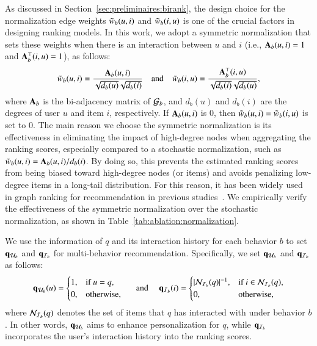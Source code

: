 As discussed in Section~\ref{sec:preliminaires:birank}, the design choice for the normalization edge weights $\tilde{w}_{b}(u, i)$ and $\tilde{w}_{b}(i, u)$ is one of the crucial factors in designing ranking models.
In this work, we adopt a symmetric normalization that sets these weights when there is an interaction between $u$ and $i$ (i.e., $\mathbf{A}_{b}(u,i)=1$ and $\mathbf{A}_{b}^{\top}(i,u)=1$), as follows:
\begin{equation*}
    \tilde{w}_{b}(u, i) = \frac{\mathbf{A}_{b}(u,i)}{\sqrt{d_b(u)}\sqrt{d_b(i)}} \quad \text{and} \quad \tilde{w}_{b}(i, u) = \frac{\mathbf{A}_{b}^{\top}(i,u)}{\sqrt{d_b(i)}\sqrt{d_b(u)}}, 
\end{equation*}
where $\mathbf{A}_{b}$ is the bi-adjacency matrix of $\mathcal{G}_{b}$, and $d_b(u)$ and $d_b(i)$ are the degrees of user $u$ and item $i$, respectively.
If $\mathbf{A}_{b}(u, i)$ is $0$, then $\tilde{w}_{b}(u, i) = \tilde{w}_{b}(i, u)$ is set to $0$.
%
The main reason we choose the symmetric normalization is its effectiveness in eliminating the impact of high-degree nodes when aggregating the ranking scores, especially compared to a stochastic normalization, such as $\tilde{w}_{b}(u, i) = \mathbf{A}_{b}(u,i)/d_b(i)$.
By doing so, this prevents the estimated ranking scores from being biased toward high-degree nodes (or items) and avoids penalizing low-degree items in a long-tail distribution. For this reason, it has been widely used in graph ranking for recommendation in previous studies~\cite{HeHDWLZW20, HeHGKW17}.
We empirically verify the effectiveness of the symmetric normalization over the stochastic normalization, as shown in Table~\ref{tab:ablation:normalization}.

We use the information of $q$ and its interaction history for each behavior $b$ to set $\mathbf{q}_{\mathcal{U}_{b}}$ and $\mathbf{q}_{\mathcal{I}_{b}}$ for multi-behavior recommendation. 
Specifically, we set $\mathbf{q}_{\mathcal{U}_{b}}$ and $\mathbf{q}_{\mathcal{I}_{b}}$ as follows:
\begin{equation*}
    \mathbf{q}_{\mathcal{U}_{b}}(u) = \begin{cases}
        1, & \text{if } u = q, \\
        0, & \text{otherwise, }
    \end{cases}
    \quad \text{ and } \quad
    \mathbf{q}_{\mathcal{I}_{b}}(i) = \begin{cases}
        |\mathcal{N}_{\mathcal{I}_{b}}(q)|^{-1}, & \text{if } i \in \mathcal{N}_{\mathcal{I}_{b}}(q), \\
        0, & \text{otherwise, }
    \end{cases}
\end{equation*}
where $\mathcal{N}_{\mathcal{I}_{b}}(q)$ denotes the set of items that $q$ has interacted with under behavior $b$.
In other words, $\mathbf{q}_{\mathcal{U}_{b}}$ aims to enhance personalization for $q$, while $\mathbf{q}_{\mathcal{I}_{b}}$ incorporates the user's interaction history into the ranking scores.

